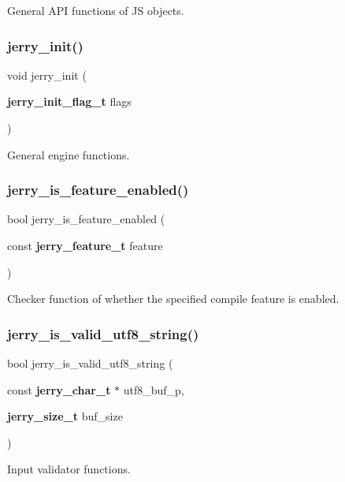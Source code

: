 General A\+PI functions of JS objects. \mbox{\label{group___core_ga0dde77933179bc0e2ad4780cacd35e3f}} 
\subsubsection{jerry\_init()}
{\footnotesize\ttfamily void jerry\+\_\+init (\begin{DoxyParamCaption}\item[{\textbf{ jerry\+\_\+init\+\_\+flag\+\_\+t}}]{flags }\end{DoxyParamCaption})}

General engine functions. \mbox{\label{group___core_gadb496b6483a94bba93f28f6a77caa4de}} 
\subsubsection{jerry\_is\_feature\_enabled()}
{\footnotesize\ttfamily bool jerry\+\_\+is\+\_\+feature\+\_\+enabled (\begin{DoxyParamCaption}\item[{const \textbf{ jerry\+\_\+feature\+\_\+t}}]{feature }\end{DoxyParamCaption})}

Checker function of whether the specified compile feature is enabled. \mbox{\label{group___core_gad08759101848d04392946109dc4c3f00}} 
\subsubsection{jerry\_is\_valid\_utf8\_string()}
{\footnotesize\ttfamily bool jerry\+\_\+is\+\_\+valid\+\_\+utf8\+\_\+string (\begin{DoxyParamCaption}\item[{const \textbf{ jerry\+\_\+char\+\_\+t} $\ast$}]{utf8\+\_\+buf\+\_\+p,  }\item[{\textbf{ jerry\+\_\+size\+\_\+t}}]{buf\+\_\+size }\end{DoxyParamCaption})}

Input validator functions. \mbox{\label{group___core_gaf852937db5dcf75a3254f8000ea8eaae}} 
